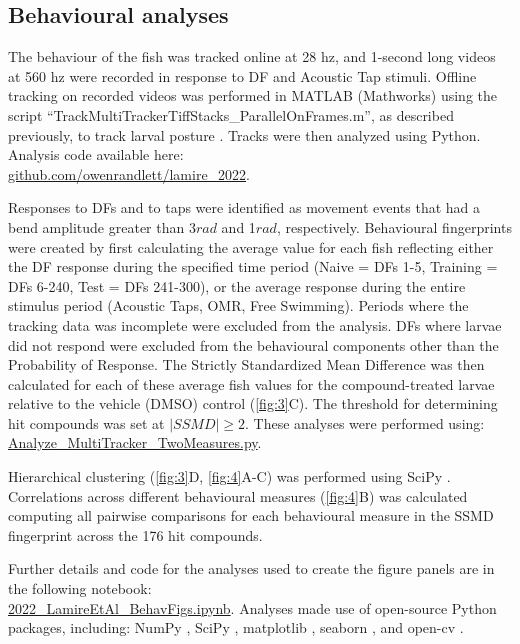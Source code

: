 \documentclass[9pt,lineno]{RandlettLab_elife}
\begin{document}
\subsection{Behavioural analyses}

The behaviour of the fish was tracked online at 28 hz, and 1-second long videos at 560 hz were recorded in response to DF and Acoustic Tap stimuli. Offline tracking on recorded videos was performed in MATLAB (Mathworks) using the script “TrackMultiTrackerTiffStacks\_ParallelOnFrames.m”, as described previously, to track larval posture \citep{Randlett2019-fi}. Tracks were then analyzed using Python. Analysis code available here: \\
\href{https://github.com/owenrandlett/lamire_2022}{github.com/owenrandlett/lamire\_2022}.

Responses to DFs and to taps were identified as movement events that had a bend amplitude greater than 3$rad$ and 1$rad$, respectively. Behavioural fingerprints were created by first calculating the average value for each fish reflecting either the DF response during the specified time period (Naive = DFs 1-5, Training = DFs 6-240, Test = DFs 241-300), or the average response during the entire stimulus period (Acoustic Taps, OMR, Free Swimming). Periods where the tracking data was incomplete were excluded from the analysis. DFs where larvae did not respond were excluded from the behavioural components other than the Probability of Response. The Strictly Standardized Mean Difference was then calculated for each of these average fish values for the compound-treated larvae relative to the vehicle (DMSO) control (\autoref{fig:3}C). The threshold for determining hit compounds was set at $|SSMD| \geq 2$. These analyses were performed using: 
\\ \href{https://github.com/owenrandlett/lamire_2022/blob/main/Analyze_MultiTracker_TwoMeasures.py}{Analyze\_MultiTracker\_TwoMeasures.py}. 

Hierarchical clustering (\autoref{fig:3}D, \autoref{fig:4}A-C) was performed using SciPy \citep{Virtanen2020-sz}. Correlations across different behavioural measures (\autoref{fig:4}B) was calculated computing all pairwise comparisons for each behavioural measure in the SSMD fingerprint across the 176 hit compounds. 

Further details and code for the analyses used to create the figure panels are in the following notebook:
\\ \href{https://nbviewer.org/github/owenrandlett/lamire_2022/blob/main/2022_LamireEtAl_BehavFigs.ipynb}{2022\_LamireEtAl\_BehavFigs.ipynb}. Analyses made use of open-source Python packages, including: NumPy \citep{Harris2020-bg}, SciPy \citep{Virtanen2020-sz}, matplotlib \citep{Hunter2007-ub}, seaborn \citep{Waskom2021-ah}, and open-cv \citep{Bradski2000-qo}.
\end{document}
